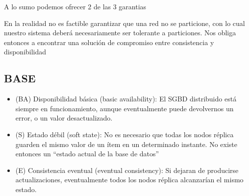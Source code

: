 A lo sumo podemos ofrecer 2 de las 3 garantias


\bigskip
En la realidad no es factible garantizar que una red no se
particione, con lo cual nuestro sistema deberá necesariamente
ser tolerante a particiones. Nos obliga entonces a encontrar una
solución de compromiso entre consistencia y disponibilidad

\subsection*{BASE}
\begin{itemize}
 \item (BA) Disponibilidad básica (basic availability): El SGBD distribuido
está siempre en funcionamiento, aunque eventualmente puede
devolvernos un error, o un valor desactualizado.

 \item (S) Estado débil (soft state): No es necesario que todas los nodos
réplica guarden el mismo valor de un ítem en un determinado
instante. No existe entonces un “estado actual de la base de datos”

 \item (E) Consistencia eventual (eventual consistency): Si dejaran de
producirse actualizaciones, eventualmente todos los nodos réplica
alcanzarían el mismo estado.
\end{itemize}


\newpage